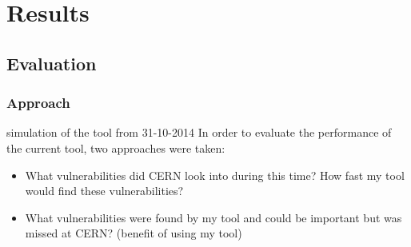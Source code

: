 \chapter{Results}
\label{chap6-results}
\thispagestyle{empty}

\section{Evaluation}

\subsection{Approach}
simulation of the tool from 31-10-2014 
In order to evaluate the performance of the current tool, two approaches were taken:
\begin{itemize}
\item What vulnerabilities did CERN look into during this time? How fast my tool would find these vulnerabilities?
\item What vulnerabilities were found by my tool and could be important but was missed at CERN? (benefit of using my tool)
\end{itemize}

